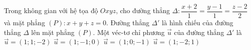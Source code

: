 \begin{ex}%
	Trong không gian với hệ tọa độ $Oxyz$, cho đường thẳng $\Delta: \dfrac{x + 2}{1}=\dfrac{y - 1}{1}=\dfrac{z - 2}{2}$ và mặt phẳng $(P): x + y + z=0. $ Đường thẳng ${\Delta}'$ là hình chiếu của đường thẳng $\Delta $ lên mặt phẳng $(P). $ Một véc-tơ chỉ phương $\overrightarrow{u}$ của đường thẳng ${\Delta}'$ là
	\choice
	{\True $\overrightarrow{u}=\left(1; 1; - 2\right)$}
	{$\overrightarrow{u}=\left(1; - 1; 0\right)$}
	{$\overrightarrow{u}=\left(1; 0; - 1\right)$}
	{$\overrightarrow{u}=\left(1; - 2; 1\right)$}
	\end{ex}

